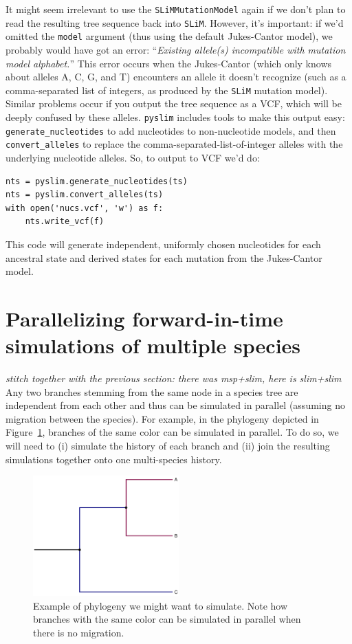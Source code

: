 \documentclass[12pt]{article}
\newcommand{\slim}[0]{\texttt{SLiM}\xspace}
\newcommand{\pyslim}[0]{\texttt{pyslim}\xspace}
\newcommand{\comment}[1]{\textit{\color{green} #1}}
\begin{document}
It might seem irrelevant to use the \verb|SLiMMutationModel| again
if we don't plan to read the resulting tree sequence back into \slim.
However, it's important: if we'd omitted the \verb|model| argument
(thus using the default Jukes-Cantor model),
we probably would have got an error:
``\textit{Existing allele(s) incompatible with mutation model alphabet.}''
This error occurs when the Jukes-Cantor (which only knows about alleles A, C, G, and T)
encounters an allele it doesn't recognize
(such as a comma-separated list of integers, as produced by the \slim mutation model).
Similar problems occur if you output the tree sequence as a VCF,
which will be deeply confused by these alleles.
\pyslim includes tools to make this output easy:
\verb|generate_nucleotides| to add nucleotides to non-nucleotide models,
and then \verb|convert_alleles| to replace the comma-separated-list-of-integer alleles
with the underlying nucleotide alleles.
So, to output to VCF we'd do:
\begin{listing}[H]
    \begin{verbatim}
nts = pyslim.generate_nucleotides(ts)
nts = pyslim.convert_alleles(ts)
with open('nucs.vcf', 'w') as f:
    nts.write_vcf(f)
    \end{verbatim}
\end{listing}
This code will generate independent, uniformly chosen nucleotides
for each ancestral state and derived states for each mutation
from the Jukes-Cantor model.


\section*{Parallelizing forward-in-time simulations of multiple species}
\comment{stitch together with the previous section: there was msp+slim, here is slim+slim}
Any two branches stemming from the same node in a species tree are independent from each other and
thus can be simulated in parallel (assuming no migration between the species).
For example, in the phylogeny depicted in Figure~\ref{fig:phylo},
branches of the same color can be simulated in parallel.
To do so, we will need to
(i) simulate the history of each branch and
(ii) join the resulting simulations together onto one multi-species history.

 \begin{figure}[h!]
 \centering
  \includegraphics[width=0.5\textwidth]{./code/parallelizing_phylogeny/phylo.pdf}
  \caption{Example of phylogeny we might want to simulate. Note how branches with the same color can be simulated in parallel when there is no migration.}
  \label{fig:phylo}
 \end{figure}
\end{document}
